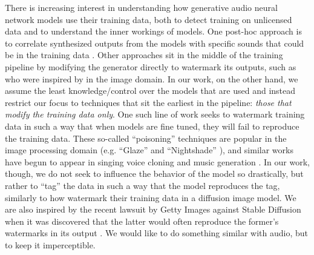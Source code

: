 \documentclass[letterpaper]{article} %
\begin{document}
There is increasing interest in understanding how generative audio neural network models use their training data, both to detect training on unlicensed data and to understand the inner workings of models.  One post-hoc approach is to correlate synthesized outputs from the models with specific sounds that could be in the training data \cite{batlle2024towards, barnett2024exploring}.  Other approaches sit in the middle of the training pipeline by modifying the generator directly to watermark its outputs, such as \cite{cao2023invisible} who were inspired by \cite{wen2023tree} in the image domain.  In our work, on the other hand, we assume the least knowledge/control over the models that are used and instead restrict our focus to techniques that sit the earliest in the pipeline: {\em those that modify the training data only}. One such line of work seeks to watermark training data in such a way that when models are fine tuned, they will fail to reproduce the training data.  These so-called ``poisoning'' techniques are popular in the image processing domain (e.g. ``Glaze'' \cite{shan2023glaze} and ``Nightshade'' \cite{shan2023prompt}), and similar works have begun to appear in singing voice cloning \cite{chen2024proactive} and music generation \cite{barnett2024defenses}.  In our work, though, we do not seek to influence the behavior of the model so drastically, but rather to ``tag'' the data in such a way that the model reproduces the tag, similarly to how \cite{ditria2023hey} watermark their training data in a diffusion image model.  We are also inspired by the recent lawsuit by Getty Images against Stable Diffusion when it was discovered that the latter would often reproduce the former's watermarks in its output \cite{vincent2023getty}.  We would like to do something similar with audio, but to keep it imperceptible.
\end{document}
